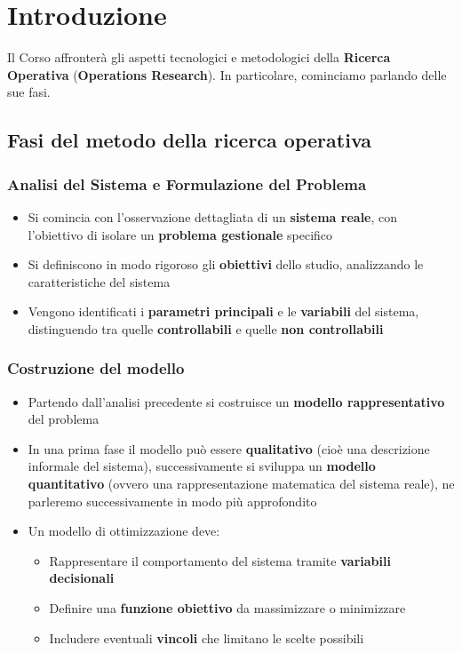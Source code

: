 
\chapter{Introduzione}
Il Corso affronterà gli aspetti tecnologici e metodologici della \textbf{Ricerca Operativa} (\textbf{Operations Research}). In particolare, cominciamo parlando delle sue fasi.

\section{Fasi del metodo della ricerca operativa}

\subsection{Analisi del Sistema e Formulazione del Problema}
\begin{itemize}
    \item Si comincia con l'osservazione dettagliata di un \textbf{sistema reale}, con l'obiettivo di isolare un \textbf{problema gestionale} specifico
    \item Si definiscono in modo rigoroso gli \textbf{obiettivi} dello studio, analizzando le caratteristiche del sistema
    \item Vengono identificati i \textbf{parametri principali} e le \textbf{variabili} del sistema, distinguendo tra quelle \textbf{controllabili} e quelle \textbf{non controllabili}
\end{itemize}

\subsection{Costruzione del modello}
\begin{itemize}
    \item Partendo dall'analisi precedente si costruisce un \textbf{modello rappresentativo} del problema
    \item In una prima fase il modello può essere \textbf{qualitativo} (cioè una descrizione informale del sistema), successivamente si sviluppa un \textbf{modello quantitativo} (ovvero una rappresentazione matematica del sistema reale), ne parleremo successivamente in modo più approfondito
    \item Un modello di ottimizzazione deve:
    \begin{itemize}
        \item Rappresentare il comportamento del sistema tramite \textbf{variabili decisionali}
        \item Definire una \textbf{funzione obiettivo} da massimizzare o minimizzare
        \item Includere eventuali \textbf{vincoli} che limitano le scelte possibili
    \end{itemize}
\end{itemize}

